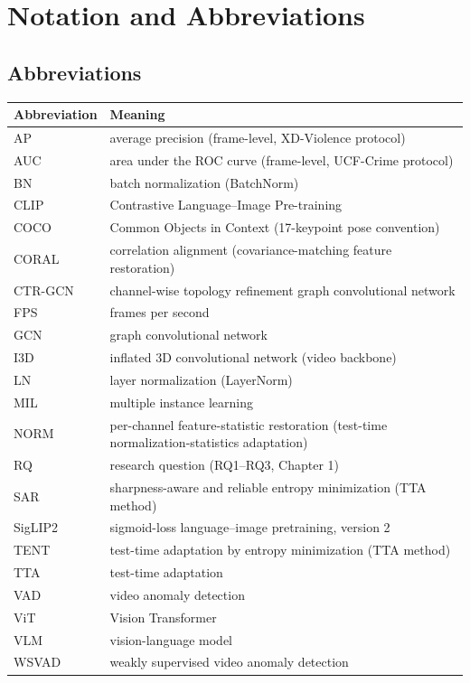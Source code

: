 \chapter*{Notation and Abbreviations}

\section*{Abbreviations}

\begin{center}
\begin{tabular}{@{}lp{10.5cm}@{}}
\toprule
Abbreviation & Meaning \\
\midrule
AP      & average precision (frame-level, XD-Violence protocol) \\
AUC     & area under the ROC curve (frame-level, UCF-Crime protocol) \\
BN      & batch normalization (BatchNorm) \\
CLIP    & Contrastive Language--Image Pre-training \\
COCO    & Common Objects in Context (17-keypoint pose convention) \\
CORAL   & correlation alignment (covariance-matching feature restoration) \\
CTR-GCN & channel-wise topology refinement graph convolutional network \\
FPS     & frames per second \\
GCN     & graph convolutional network \\
I3D     & inflated 3D convolutional network (video backbone) \\
LN      & layer normalization (LayerNorm) \\
MIL     & multiple instance learning \\
NORM    & per-channel feature-statistic restoration (test-time
          normalization-statistics adaptation) \\
RQ      & research question (RQ1--RQ3, Chapter 1) \\
SAR     & sharpness-aware and reliable entropy minimization (TTA method) \\
SigLIP2 & sigmoid-loss language--image pretraining, version 2 \\
TENT    & test-time adaptation by entropy minimization (TTA method) \\
TTA     & test-time adaptation \\
VAD     & video anomaly detection \\
ViT     & Vision Transformer \\
VLM     & vision-language model \\
WSVAD   & weakly supervised video anomaly detection \\
\bottomrule
\end{tabular}
\end{center}

